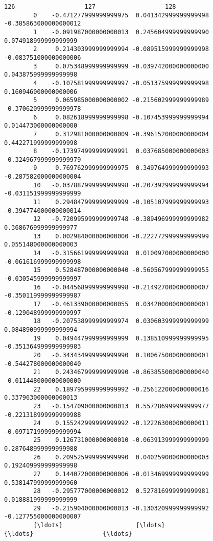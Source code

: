 \documentclass[11pt]{article}
\begin{document}
\begin{Verbatim}[commandchars=\\\{\}]
                               126                   127                   128  
        0    -0.471277999999999975  0.041342999999999998 -0.385863000000000012  
        1    -0.091987000000000013  0.245604999999999990  0.074918999999999999  
        2     0.214303999999999994 -0.089515999999999998 -0.083751000000000006  
        3     0.075348999999999999 -0.039742000000000000  0.043875999999999998  
        4    -0.107581999999999997 -0.051375999999999998  0.160946000000000006  
        5     0.065985000000000002 -0.215602999999999989 -0.370620999999999978  
        6     0.082618999999999998 -0.107453999999999994  0.014473000000000000  
        7     0.312981000000000009 -0.396152000000000004  0.442271999999999998  
        8    -0.173974999999999991  0.037685000000000003 -0.324967999999999979  
        9     0.769762999999999975  0.349764999999999993 -0.287582000000000004  
        10   -0.037887999999999998 -0.207392999999999994 -0.031151999999999999  
        11    0.294847999999999999 -0.105107999999999993 -0.394774000000000014  
        12   -0.720995999999999748 -0.389496999999999982  0.368676999999999977  
        13    0.002984000000000000 -0.222772999999999999  0.055148000000000003  
        14   -0.315661999999999998  0.010097000000000000 -0.061616999999999998  
        15    0.528487000000000040 -0.560567999999999955 -0.030545999999999997  
        16   -0.044568999999999998 -0.214927000000000007 -0.350119999999999987  
        17   -0.461339000000000055  0.034200000000000001 -0.129048999999999997  
        18   -0.207538999999999974  0.030603999999999999  0.084890999999999994  
        19    0.049447999999999999  0.138510999999999995 -0.351364999999999983  
        20   -0.343434999999999990  0.100675000000000001 -0.544278000000000040  
        21    0.243467999999999990 -0.863855000000000040 -0.011448000000000000  
        22    0.189795999999999992 -0.256122000000000016  0.337963000000000013  
        23   -0.154709000000000013  0.557286999999999977 -0.221318999999999988  
        24    0.155242999999999992 -0.122263000000000011 -0.097171999999999994  
        25    0.126731000000000010 -0.063913999999999999  0.287648999999999988  
        26    0.209525999999999990  0.040259000000000003  0.192409999999999998  
        27    0.144072000000000006 -0.013469999999999999  0.538147999999999960  
        28   -0.295777000000000012  0.527816999999999981  0.018881999999999999  
        29   -0.215904000000000013 -0.130320999999999992 -0.127755000000000007  
        {\ldots}                    {\ldots}                   {\ldots}                   {\ldots}  

\end{Verbatim}
\end{document}
